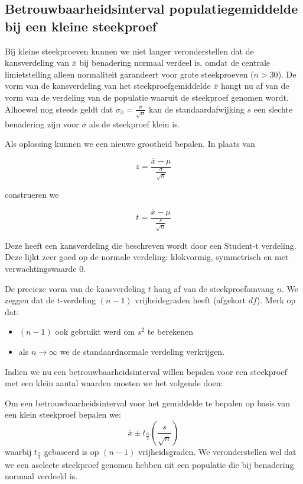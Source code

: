 {\subsection{Betrouwbaarheidsinterval populatiegemiddelde bij een kleine steekproef}
\label{ssec:betrouwbaarheidsinterval-kleine-steekproef}

Bij kleine steekproeven kunnen we niet langer veronderstellen dat de kansverdeling van $\overline{x}$ bij benadering
normaal verdeel is, omdat de centrale limietstelling alleen normaliteit garandeert voor grote steekproeven ($n >30$). De vorm
van de kansverdeling van het steekproefgemiddelde $\overline{x}$ hangt nu af van de vorm van de verdeling van de populatie waaruit de
steekproef genomen wordt. Alhoewel nog steeds geldt dat $\sigma_{\overline{x}} = \frac{\sigma}{\sqrt{n}}$ kan
de standaardafwijking $s$ een slechte benadering zijn voor $\sigma$ als de steekproef klein is.

Als oplossing kunnen we een nieuwe grootheid bepalen. In plaats van

\[ z = \frac{\overline{x} - \mu}{\frac{\sigma}{\sqrt{n}}} \]

construeren we

\[ t = \frac{\overline{x} - \mu}{\frac{s}{\sqrt{n}}} \]

Deze heeft een kansverdeling die beschreven wordt door een Student-t verdeling. Deze lijkt zeer goed op de normale verdeling: klokvormig, symmetrisch en met verwachtingswaarde 0.

De precieze vorm van de kansverdeling $t$ hang af van de steekproefomvang $n$. We zeggen dat de t-verdeling $(n-1)$ vrijheidsgraden heeft (afgekort $df$).
Merk op dat:
\begin{itemize}
  \item $(n-1)$ ook gebruikt werd om $s^{2}$ te berekenen
  \item als $n \rightarrow \infty$ we de standaardnormale verdeling verkrijgen.
\end{itemize}

Indien we nu een betrouwbaarheidsinterval willen bepalen voor een steekproef met een klein aantal waarden moeten we het volgende doen:

\begin{definition}
  Om een betrouwbaarheidsinterval voor het gemiddelde te bepalen op basis van een klein steekproef bepalen we:
  \[ \overline{x} \pm t_{\frac{\alpha}{2}}(\frac{s}{\sqrt{n}}) \]
  waarbij $t_{\frac{\alpha}{2}}$ gebaseerd is op $(n-1)$ vrijheidsgraden. We veronderstellen wel dat we een aselecte steekproef genomen hebben uit
  een populatie die bij benadering normaal verdeeld is.
\end{definition}

}
